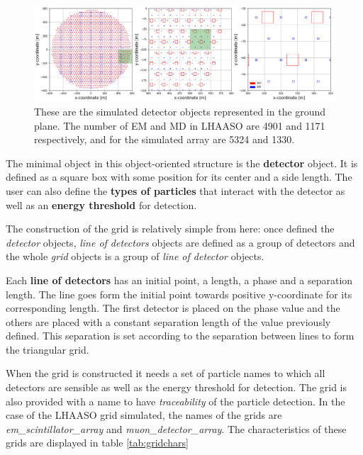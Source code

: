 \documentclass{article}
\begin{document}
 \begin{figure}[!h]
    \centering
    \includegraphics[width=\textwidth]{imgs/detect_array_lhaaso.png}
    \caption{These are the simulated detector objects represented in the ground plane. The number of EM and MD in LHAASO are 4901 and 1171 respectively, and for the simulated array are 5324 and 1330.}
    \label{fig:detectorarray}
\end{figure}

The minimal object in this object-oriented structure is the \textbf{detector} object. It is defined as a square box with some position for its center and a side length. The user can also define the \textbf{types of particles} that interact with the detector as well as an \textbf{energy threshold} for detection. 

The construction of the grid is relatively simple from here: once defined the \textit{detector} objects, \textit{line of detectors} objects are defined as a group of detectors and the whole \textit{grid} objects is a group of \textit{line of detector} objects. 

Each \textbf{line of detectors} has an initial point, a length, a phase and a separation length. The line goes form the initial point towards positive y-coordinate for its corresponding length. The first detector is placed on the phase value and the others are placed with a constant separation length of the value previously defined. This separation is set according to the separation between lines to form the triangular grid.

When the grid is constructed it needs a set of particle names to which all detectors are sensible as well as the energy threshold for detection. The grid is also provided with a name to have \textit{traceability} of the particle detection. In the case of the LHAASO grid simulated, the names of the grids are \emph{em\_scintillator\_array} and \emph{muon\_detector\_array}.
The characteristics of these grids are displayed in table \ref{tab:gridchars}
\end{document}
